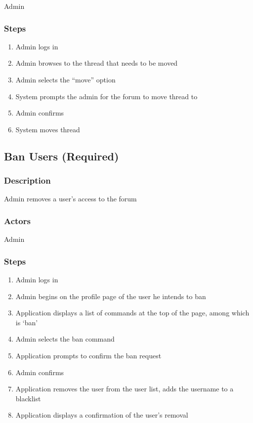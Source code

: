 \documentclass[12pt]{scrartcl}
\begin{document}
Admin

\subsubsection{Steps}
\begin {enumerate}
\item Admin logs in
\item Admin browses to the thread that needs to be moved
\item Admin selects the “move” option
\item System prompts the admin for the forum to move thread to
\item Admin confirms
\item System moves thread
\end {enumerate}



\subsection{Ban Users (Required)}
\subsubsection{Description}
 
Admin removes a user’s access to the forum

\subsubsection{Actors}
 
Admin
 
\subsubsection{Steps}
\begin{enumerate}
\item Admin logs in
\item Admin begins on the profile page of the user he intends to ban
\item Application displays a list of commands at the top of the page, among which is ‘ban’
\item Admin selects the ban command
\item Application prompts to confirm the ban request
\item Admin confirms
\item Application removes the user from the user list, adds the username to a blacklist
\item Application displays a confirmation of the user’s removal
\end {enumerate}
\end{document}
